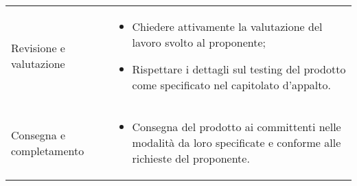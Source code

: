 {\begin{longtable}{ C{4cm} C{12cm}}
	Revisione e valutazione & \begin{itemize} \item Chiedere attivamente la valutazione del lavoro svolto al proponente; \item Rispettare i dettagli sul testing del prodotto come specificato nel capitolato d'appalto. \end{itemize}\\	
	Consegna e completamento & \begin{itemize} \item Consegna del prodotto ai committenti nelle modalità da loro specificate e conforme alle richieste del proponente. \end{itemize}\\
\end{longtable}
}
